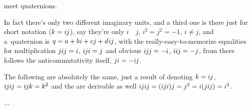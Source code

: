 \noindent
meet quaternions.

In fact there’s only two different imaginary units,
and a third one is there just for short notation (${k = i \hspace{-0.1ex} j}$),
say they’re only $i$~~$j$, ${i^2 = j^2 = -1}$, ${i \neq j}$,
and a~quaternion is ${q = a + b \hspace{.1ex} i + cj + d \hspace{.2ex} i \hspace{-0.1ex} j}$,
with the really-easy-to-memorize equalities for multiplication
${j i \hspace{-0.1ex} j = i}$, ${i \hspace{-0.1ex} j i = j}$
and obvious
${i \hspace{-0.1ex} j \hspace{-0.1ex} j = -i}$, ${ii \hspace{-0.1ex} j = -j}$,
from there follows the anticommutativity itself,
${ji = -i \hspace{-0.1ex} j}$.

The following are absolutely the same,
just a result of denoting ${k = i \hspace{-0.1ex} j}$,
${i \hspace{-0.1ex} j i \hspace{-0.1ex} j = i \hspace{-0.1ex} j k = k^2}$
and the  are derivable as well
${i \hspace{-0.1ex} j i \hspace{-0.1ex} j = (i \hspace{-0.1ex} ji)j = j^2 = i(ji \hspace{-0.1ex} j) = i^2}$.

...


